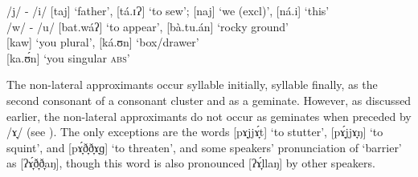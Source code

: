\ea
/j/ - /i/    [taj] ‘father’, [tá.ɪɁ] ‘to sew’; [naj] ‘we (excl)’, [ná.i] ‘this’ \\
/w/ - /u/  [bat.wáʔ] ‘to appear’, [bà.tu.án] ‘rocky ground’ \\
{}     [kaw] ‘you plural’, [ká.ʊn] ‘box/drawer’ \\
{}     [ka.ʊ́n] ‘you singular \textsc{abs}’
\z

The non-lateral approximants occur syllable initially, syllable finally, as the second consonant of a consonant cluster and as a geminate. However, as discussed earlier,  the non-lateral approximants do not occur as geminates when preceded by /ɤ̞/ (see ). The only exceptions are the words [pɤ̞jjɤ̞́t] ‘to stutter’, [pɤ̞́jjɤ̞ŋ] ‘to squint’, and [pɤ̞́ð̞ð̞ɤ̞ɡ] ‘to threaten', and some speakers’ pronunciation of ‘barrier’ as [ʔɤ̞́ð̞ð̞aŋ], though this word is also pronounced [ʔɤ̞́llaŋ] by other speakers.

